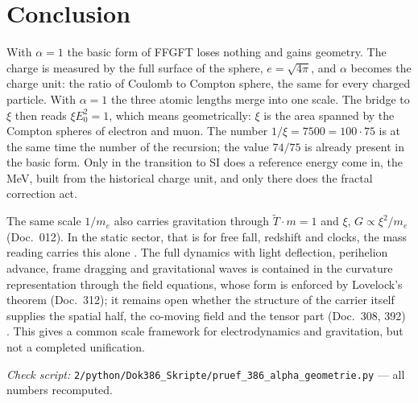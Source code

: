 \section{Conclusion}

With $\alpha=1$ the basic form of FFGFT loses nothing and gains geometry. The charge is measured
by the full surface of the sphere, $e=\sqrt{4\pi}$, and $\alpha$ becomes the charge unit: the ratio
of Coulomb to Compton sphere, the same for every charged particle. With $\alpha=1$ the three atomic
lengths merge into one scale. The bridge to $\xi$ then reads $\xi E_0^2=1$, which means
geometrically: $\xi$ is the area spanned by the Compton spheres of electron and muon. The number
$1/\xi=7500=100\cdot75$ is at the same time the number of the recursion; the value $74/75$ is
already present in the basic form. Only in the transition to SI does a reference energy come in,
the MeV, built from the historical charge unit, and only there does the fractal correction act.

The same scale $1/m_e$ also carries gravitation through $\tilde T\cdot m=1$ and $\xi$, $G\propto\xi^2/m_e$
(Doc.~012). In the static sector, that is for free fall, redshift and clocks, the mass reading
carries this alone \KM. The full dynamics with light deflection, perihelion advance, frame dragging
and gravitational waves is contained in the curvature representation through the field equations,
whose form is enforced by Lovelock's theorem (Doc.~312); it remains open whether the structure of
the carrier itself supplies the spatial half, the co-moving field and the tensor part
(Doc.~308, 392) \SM. This gives a common scale framework for electrodynamics and gravitation, but
not a completed unification.

\vspace{1em}
\noindent\textit{Check script:} \texttt{2/python/Dok386\_Skripte/pruef\_386\_alpha\_geometrie.py}
--- all numbers recomputed.

